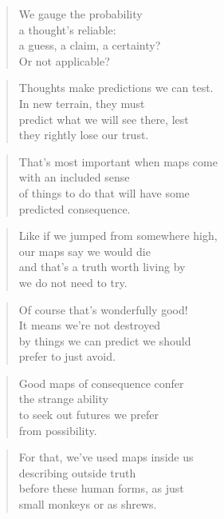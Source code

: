 \documentclass[10pt,a4paper]{article}
\begin{document}
\begin{multicols}{2}
\begin{verse}
We gauge the probability\\
a thought’s reliable:\\
a guess, a claim, a certainty?\\
Or not applicable?
\end{verse}

\begin{verse}
Thoughts make predictions we can test.\\
In new terrain, they must\\
predict what we will see there, lest\\
they rightly lose our trust.
\end{verse}

\begin{verse}
That’s most important when maps come\\
with an included sense\\
of things to do that will have some\\
predicted consequence.
\end{verse}

\begin{verse}
Like if we jumped from somewhere high,\\
our maps say we would die\\
and that’s a truth worth living by\\
we do not need to try.
\end{verse}

\begin{verse}
Of course that’s wonderfully good!\\
It means we’re not destroyed\\
by things we can predict we should\\
prefer to just avoid.
\end{verse}

\begin{verse}
Good maps of consequence confer\\
the strange ability\\
to seek out futures we prefer\\
from possibility.
\end{verse}

\begin{verse}
For that, we’ve used maps inside us\\
describing outside truth\\
before these human forms, as just\\
small monkeys or as shrews.
\end{verse}


\end{multicols}
\end{document}
